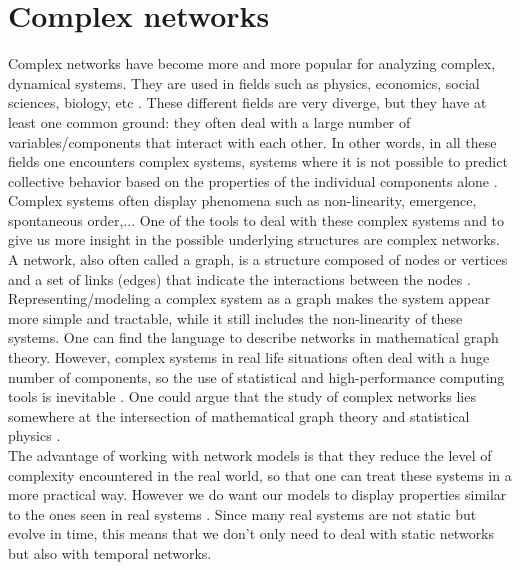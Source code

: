 \documentclass[11 pt , letterpaper , twoside , openright]{book}
\begin{document}
\section{Complex networks}

Complex networks have become more and more popular for analyzing complex, dynamical systems. They are used in fields such as physics, economics, social sciences, biology, etc \cite{Costa2008}. These different fields are very diverge, but they have at least one common ground: they often deal with a large number of variables/components that interact with each other. In other words, in all these fields one encounters complex systems, systems where it is not possible to predict collective behavior based on the properties of the individual components alone \cite{Mata2020}. Complex systems often display phenomena such as non-linearity, emergence, spontaneous order,... %
One of the tools to deal with these complex systems and to give us more insight in the possible underlying structures are complex networks. A network, also often called a graph, is a structure composed of nodes or vertices and a set of links (edges) that indicate the interactions between the nodes \cite{Mata2020}. Representing/modeling a complex system as a graph makes the system appear more simple and tractable, while it still includes the non-linearity of these systems. One can find the language to describe networks in mathematical graph theory. However, complex systems in real life situations often deal with a huge number of components, so the use of statistical and high-performance computing tools is inevitable \cite{Mata2020}. One could argue that the study of complex networks lies somewhere at the intersection of mathematical graph theory and statistical physics \cite{F.Costa2007}.\\
The advantage of working with network models is that they reduce the level of complexity encountered in the real world, so that one can treat these systems in a more practical way. However we do want our models to display properties similar to the ones seen in real systems \cite{Mata2020}. Since many real systems are not static but evolve in time, this means that we don't only need to deal with static networks but also with temporal networks. %
\end{document}
